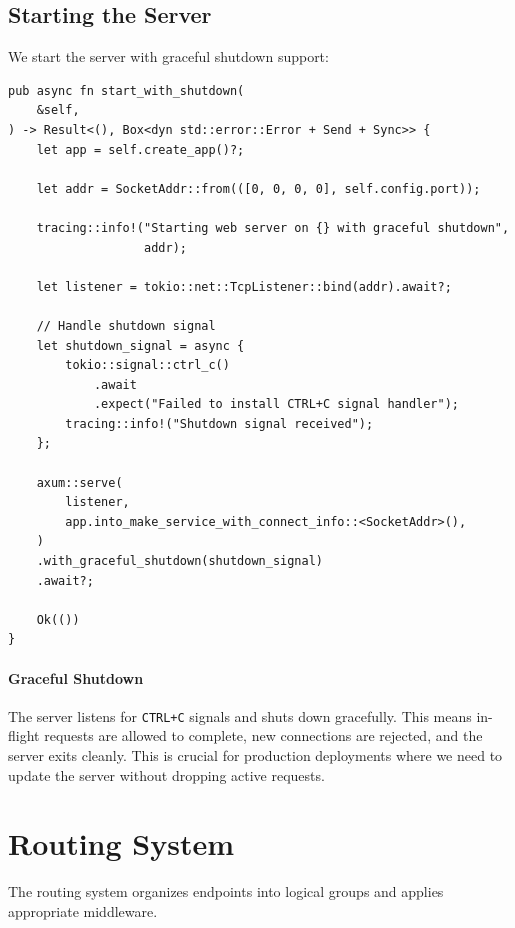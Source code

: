 \subsection{Starting the Server}

We start the server with graceful shutdown support:

\begin{listing}[htbp]
\caption{Server startup with graceful shutdown}
\label{lst:server-startup}
\begin{verbatim}
pub async fn start_with_shutdown(
    &self,
) -> Result<(), Box<dyn std::error::Error + Send + Sync>> {
    let app = self.create_app()?;

    let addr = SocketAddr::from(([0, 0, 0, 0], self.config.port));

    tracing::info!("Starting web server on {} with graceful shutdown",
                   addr);

    let listener = tokio::net::TcpListener::bind(addr).await?;

    // Handle shutdown signal
    let shutdown_signal = async {
        tokio::signal::ctrl_c()
            .await
            .expect("Failed to install CTRL+C signal handler");
        tracing::info!("Shutdown signal received");
    };

    axum::serve(
        listener,
        app.into_make_service_with_connect_info::<SocketAddr>(),
    )
    .with_graceful_shutdown(shutdown_signal)
    .await?;

    Ok(())
}
\end{verbatim}
\end{listing}

\paragraph{Graceful Shutdown}
The server listens for \texttt{CTRL+C} signals and shuts down gracefully. This means in-flight requests are allowed to complete, new connections are rejected, and the server exits cleanly. This is crucial for production deployments where we need to update the server without dropping active requests.

\section{Routing System}
\label{sec:routing}

The routing system organizes endpoints into logical groups and applies appropriate middleware.

